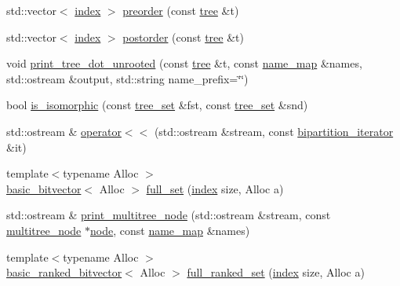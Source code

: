 \begin{DoxyCompactItemize}
\item 
std\+::vector$<$ \hyperlink{namespaceterraces_adbc33ccb543d1634e96d0eb02e472c77}{index} $>$ \hyperlink{namespaceterraces_a24dbd28eb2657b6dd98233b26b20b93f}{preorder} (const \hyperlink{namespaceterraces_a07aaf7feec4a22c6cdefc14c5a81bdd0}{tree} \&t)
\item 
std\+::vector$<$ \hyperlink{namespaceterraces_adbc33ccb543d1634e96d0eb02e472c77}{index} $>$ \hyperlink{namespaceterraces_ac51a269450af323210628bd90b96c694}{postorder} (const \hyperlink{namespaceterraces_a07aaf7feec4a22c6cdefc14c5a81bdd0}{tree} \&t)
\item 
void \hyperlink{namespaceterraces_a07490ad6d9b91f5d4cd609450676516c}{print\+\_\+tree\+\_\+dot\+\_\+unrooted} (const \hyperlink{namespaceterraces_a07aaf7feec4a22c6cdefc14c5a81bdd0}{tree} \&t, const \hyperlink{namespaceterraces_a4ef0217fe5aed881737d9bc5a8d45dca}{name\+\_\+map} \&names, std\+::ostream \&output, std\+::string name\+\_\+prefix=\char`\"{}\char`\"{})
\item 
bool \hyperlink{namespaceterraces_a58682ec06711d5ae85a58aec6d811d31}{is\+\_\+isomorphic} (const \hyperlink{structterraces_1_1tree__set}{tree\+\_\+set} \&fst, const \hyperlink{structterraces_1_1tree__set}{tree\+\_\+set} \&snd)
\item 
std\+::ostream \& \hyperlink{namespaceterraces_a746aa89cd7b3de5dc7dcc7bc90b08e74}{operator$<$$<$} (std\+::ostream \&stream, const \hyperlink{classterraces_1_1bipartition__iterator}{bipartition\+\_\+iterator} \&it)
\item 
{\footnotesize template$<$typename Alloc $>$ }\\\hyperlink{classterraces_1_1basic__bitvector}{basic\+\_\+bitvector}$<$ Alloc $>$ \hyperlink{namespaceterraces_a89a9c3d18566c475960fa9bbe5954049}{full\+\_\+set} (\hyperlink{namespaceterraces_adbc33ccb543d1634e96d0eb02e472c77}{index} size, Alloc a)
\item 
std\+::ostream \& \hyperlink{namespaceterraces_ab0b3ce0b155ae5858d90f33dd51bf489}{print\+\_\+multitree\+\_\+node} (std\+::ostream \&stream, const \hyperlink{structterraces_1_1multitree__node}{multitree\+\_\+node} $\ast$\hyperlink{structterraces_1_1node}{node}, const \hyperlink{namespaceterraces_a4ef0217fe5aed881737d9bc5a8d45dca}{name\+\_\+map} \&names)
\item 
{\footnotesize template$<$typename Alloc $>$ }\\\hyperlink{classterraces_1_1basic__ranked__bitvector}{basic\+\_\+ranked\+\_\+bitvector}$<$ Alloc $>$ \hyperlink{namespaceterraces_a75e78e4205ecb8d8dbd3485c464741fe}{full\+\_\+ranked\+\_\+set} (\hyperlink{namespaceterraces_adbc33ccb543d1634e96d0eb02e472c77}{index} size, Alloc a)

\end{DoxyCompactItemize}
